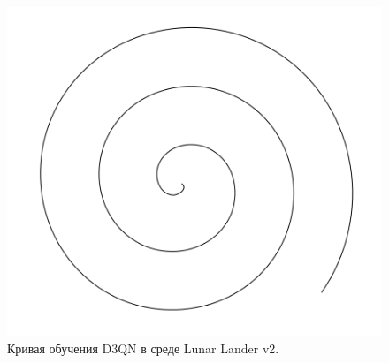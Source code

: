 \begin{figure}
	\centering
	\includegraphics[width=\textwidth]{figures/pic01}
	\caption{Кривая обучения D3QN в среде Lunar Lander v2.}
	\label{fig:spire01}
\end{figure}


